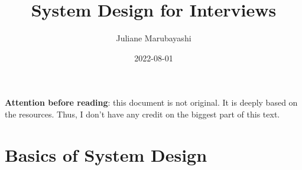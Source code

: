 \documentclass{article}
\title{System Design for Interviews}
\author{Juliane Marubayashi}
\date{ 2022-08-01 }
\begin{document}
    \maketitle
    \newpage
    \tableofcontents
    \newpage
    \textbf{Attention before reading}: this document is not original. It is deeply based on the resources.
    Thus, I don't have any credit on the biggest part of this text. 
    \section{Basics of System Design}
    
    
\end{document}
